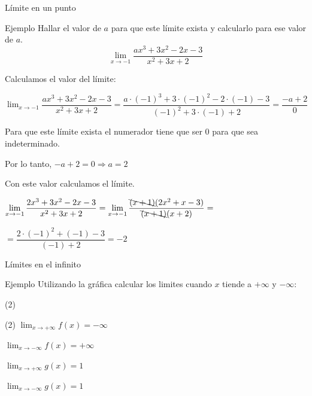 \documentclass[8pt,handout]{beamer}
\newcommand{\limite}[2]{\displaystyle \lim_{x \rightarrow #1}{#2}}
\begin{document}
\begin{frame}{Límite en un punto}
\begin{exampleblock}{Ejemplo}
Hallar el valor de $a$ para que este límite exista y calcularlo para ese valor de $a$.
\[ \limite{-1}{\dfrac{ax^3+3x^2-2x-3}{x^2+3x+2}} \]
\end{exampleblock}

Calculamos el valor del límite:

$\limite{-1}{\dfrac{ax^3+3x^2-2x-3}{x^2+3x+2}}= \dfrac{a\cdot (-1)^3+3\cdot (-1)^2-2\cdot (-1)-3}{(-1)^2+3\cdot (-1)+2}=\dfrac{-a+2}{0} $

Para que este límite exista el numerador tiene que ser $0$ para que sea indeterminado.

Por lo tanto, $-a+2=0 \Rightarrow a= 2$

Con este valor calculamos el límite.

$\limite{-1}{\dfrac{2x^3+3x^2-2x-3}{x^2+3x+2}}= \limite{-1}{\dfrac{\bcancel{(x+1)}(2x^2+x-3)}{\bcancel{(x+1)}(x+2)}}=$

\vspace{10pt}
$=\dfrac{2\cdot(-1)^2+(-1)-3}{(-1)+2}= -2$


\end{frame}

\begin{frame}{Límites en el infinito}
\begin{exampleblock}{Ejemplo}
Utilizando la gráfica calcular los limites cuando $x$ tiende a $+\infty$ y $-\infty$:
 \begin{tasks}[label=\alph*)](2)
\task 

\task

\end{tasks}
\end{exampleblock}

\begin{tasks}[label=\alph*)](2)
\task $\limite{+\infty}{f(x)}=-\infty$

$\limite{-\infty}{f(x)}=+\infty$

\task $\limite{+\infty}{g(x)}=1$

$\limite{-\infty}{g(x)}=1$

\end{tasks}
\end{frame}
\end{document}
